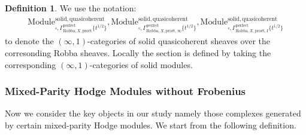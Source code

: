 \documentclass[12pt]{book}
\theoremstyle{definition}
\newtheorem{definition}{Definition}
\begin{document}
\begin{definition}
We use the notation:
\begin{align}
\mathrm{Module}^\mathrm{solid,quasicoherent}_{\square,\Gamma^\mathrm{perfect}_{\text{Robba},X,\text{pro\'et}}\{t^{1/2}\}},\mathrm{Module}^\mathrm{solid,quasicoherent}_{\square,\Gamma^\mathrm{perfect}_{\text{Robba},X,\text{pro\'et},\infty}\{t^{1/2}\}},
\mathrm{Module}^\mathrm{solid,quasicoherent}_{\square,\Gamma^\mathrm{perfect}_{\text{Robba},X,\text{pro\'et},I}\{t^{1/2}\}} 
\end{align}
to denote the $(\infty,1)$-categories of solid quasicoherent sheaves over the corresonding Robba sheaves. Locally the section is defined by taking the corresponding $(\infty,1)$-categories of solid modules.
\end{definition}


\subsubsection{Mixed-Parity Hodge Modules without Frobenius}

\noindent Now we consider the key objects in our study namely those complexes generated by certain mixed-parity Hodge modules. We start from the following definition.
\end{document}
